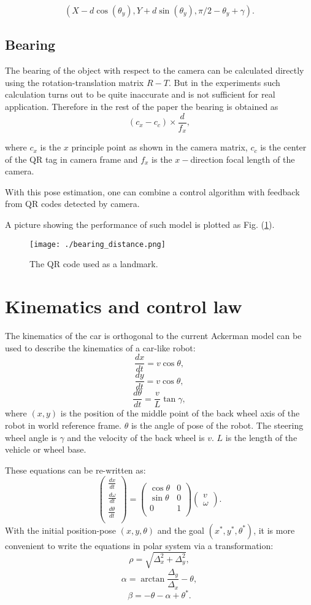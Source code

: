 \documentclass[12pt]{article}
\begin{document}
$$(X-d\cos(\theta_y),Y+d\sin(\theta_y),\pi/2-\theta_y+\gamma).$$
\subsection{Bearing}
The bearing of the object with respect to the camera can be calculated directly using the rotation-translation matrix $R-T$. But in the experiments such calculation turns out to be quite inaccurate and is not sufficient for real application. Therefore in the rest of the paper the bearing is obtained as $$(c_x-c_c)\times \frac{d}{f_x},$$

where $c_x$ is the $x$ principle point as shown in the camera matrix, $c_c$ is the center of the QR tag in camera frame and $f_x$ is the $x-$direction focal length of the camera.

With this pose estimation, one can combine a control algorithm with feedback from QR codes detected by camera.

A picture showing the performance of such model is plotted as  Fig. (\ref{QR}).
\begin{figure}[htbp]
\centering
\texttt{[image: ./bearing\_distance.png]}
\caption{The QR code used as a landmark.}\label{QR}
\end{figure}
\section{Kinematics and control law}
\label{kine}
The kinematics of the car is orthogonal to the current 
Ackerman model can be used to describe the kinematics of a car-like robot: 
$$\frac{d x}{dt}=v\cos \theta,$$
$$\frac{d y}{dt}=v\cos \theta,$$
$$\frac{d \theta}{dt}=\frac{v}{L}\tan \gamma,$$
where $(x,y)$ is the position of the middle point of the back wheel axis of the robot in world reference frame. $\theta$ is the angle of pose of the robot. The steering wheel angle is $\gamma$ and the velocity of the back wheel is $v$. $L$ is the length of the vehicle or wheel base.

These equations can be re-written as:
$$
\begin{pmatrix}
\frac{d x}{dt} \\
\frac{d \omega}{dt} \\
\frac{d \theta}{dt} \\
\end{pmatrix}
=
\begin{pmatrix}
\cos \theta & 0 \\
\sin \theta & 0 \\
0 & 1\\
\end{pmatrix}
\begin{pmatrix}
v \\
\omega
\end{pmatrix}.
$$
With the initial position-pose $(x,y,\theta)$ and the goal $(x^*,y^*,\theta^*)$, it is more convenient to write the equations in polar system via a transformation:
$$\rho=\sqrt{\Delta_x^2+\Delta_y^2},$$
$$\alpha=\arctan \frac{\Delta_y}{\Delta_x}-\theta,$$
$$\beta=-\theta-\alpha+\theta^*.$$
\end{document}
